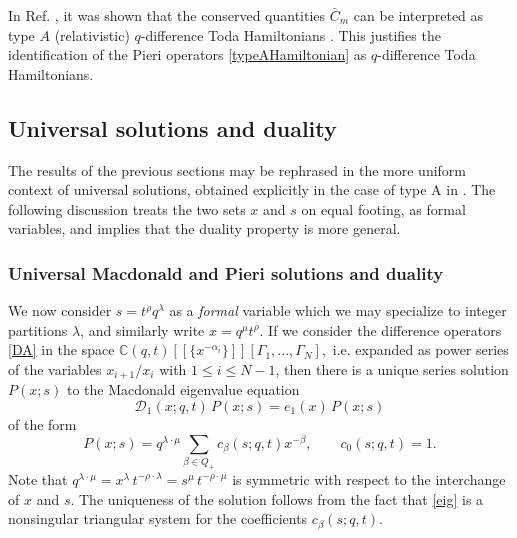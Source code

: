 \documentclass[12pt]{amsart}
\newcommand{\C}{{\mathbb C}}
\newcommand{\al}{{\alpha}}
\numberwithin{equation}{section}
\begin{document}
In Ref. \cite{DFK15}, it was shown that the conserved quantities $\bar C_m$ can be interpreted as type $A$ (relativistic) 
$q$-difference Toda Hamiltonians \cite{Etingof}. This justifies the identification of the  Pieri operators \eqref{typeAHamiltonian} 
as $q$-difference Toda Hamiltonians.

\subsection{Universal solutions and duality}\label{universAsec}

The results of the previous sections may be rephrased in the more uniform context of universal solutions, obtained explicitly in the case of type A in \cite{ShiraishiNoumi}. The following discussion treats the two sets $x$ and $s$ on equal footing, as formal variables, and implies that the duality property is more general.

\subsubsection{Universal Macdonald and Pieri solutions and duality}
We now consider $s=t^{\rho}q^{\lambda}$ as a {\it formal} variable which we may specialize to
integer partitions $\lambda$, and similarly write $x=q^\mu t^\rho$.
%
If we consider the difference operators \eqref{DA} in the space $\C(q,t)[[\{x^{-\al_i}\}]][\Gamma_1,...,\Gamma_N],$
i.e. expanded as power series of the variables $x_{i+1}/x_i$ with $1\leq i \leq N-1$,
%
then there is a unique series solution $P(x;s)$ to the Macdonald eigenvalue equation
\begin{equation}\label{eig}
\mathcal D_1(x;q,t)\, P(x;s)= e_1(x)\, P(x;s)
\end{equation}
of the form
\begin{equation}\label{xseriessol}
P(x;s) = q^{\lambda\cdot \mu} \sum_{\beta\in Q_+} c_{\beta}(s;q,t) x^{-\beta}, \qquad c_0(s;q,t)=1. 
\end{equation}
%
%
%
Note that $q^{\lambda\cdot \mu}=x^\lambda\, t^{-\rho\cdot \lambda}  = s^\mu \,t^{-\rho\cdot \mu}$ is symmetric with respect to the interchange of $x$ and $s$. The uniqueness of the solution follows from the fact that \eqref{eig} is a nonsingular triangular system for the coefficients $c_\beta(s;q,t)$.
\end{document}
